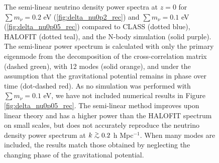 \documentclass[twocolumn,superscriptaddress,prd]{revtex4}
\def\gtsima{$\; \buildrel > \over \sim \;$}
\def\gsim{\lower.5ex\hbox{\gtsima}}
\newcommand{\halofit}{HALOFIT }
\begin{document}
\begin{figure}[h!]
  \centering
  \caption{The semi-linear neutrino density power spectra at $z=0$ for
      $\textstyle\sum m_\nu =0.2$ eV (\ref{fig:delta_nu0p2_rec}) and $\textstyle\sum
      m_\nu = 0.1$ eV (\ref{fig:delta_nu0p05_rec}) compared to
      CLASS (dotted blue), \halofit (dotted teal), and the N-body simulation (solid purple).  The semi-linear power spectrum is calculated with only the primary
eigenmode from the decomposition of the cross-correlation matrix
(dashed green), with 12 modes (solid orange), and under the assumption
that the gravitational potential remains in phase over time
(dot-dashed red). As no
      simulation was performed with $\textstyle\sum m_\nu = 0.1$ eV, we have not
      included numerical results in Figure
      \ref{fig:delta_nu0p05_rec}.  The
      semi-linear method improves upon linear theory and has a higher
      power than the \halofit spectrum on small scales, but does not
      accurately reproduce the neutrino density power spectrum at
      $k\gsim0.2$ h Mpc$^{-1}$. When many modes are included, the
      results match those obtained by neglecting the changing phase of
      the gravitational potential. }
    \label{fig:delta_nu_rec}
\end{figure}
\end{document}
